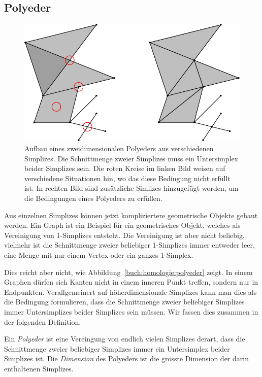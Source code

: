 \subsection{Polyeder}
\begin{figure}
\centering
\includegraphics{chapters/95-homologie/images/polyeder.pdf}
\caption{Aufbau eines zweidimensionalen Polyeders aus
verschiedenen Simplizes.
Die Schnittmenge zweier Simplizes muss ein Untersimplex beider Simplizes
sein.
Die roten Kreise im linken Bild weisen auf verschiedene Situationen
hin, wo das diese Bedingung nicht erfüllt ist.
In rechten Bild sind zusätzliche Simlizes hinzugefügt worden, um
die Bedingungen eines Polyeders zu erfüllen.
\label{buch:homologie:figure:polyeder}}
\end{figure}
Aus einzelnen Simplizes können jetzt kompliziertere geometrische
Objekte gebaut werden.
Ein Graph ist ein Beispiel für ein geometrisches Objekt, welches
als Vereinigung von 1-Simplizes entsteht.
Die Vereinigung ist aber nicht beliebig, vielmehr ist die Schnittmenge
zweier beliebiger 1-Simplizes immer entweder leer, eine Menge 
mit nur einem Vertex oder ein ganzes 1-Simplex.

Dies reicht aber nicht, wie Abbildung~\ref{buch:homologie:polyeder}
zeigt.
In einem Graphen dürfen sich Kanten nicht in einem inneren Punkt treffen,
sondern nur in Endpunkten.
Verallgemeinert auf höherdimensionale Simplizes kann man dies als die
Bedingung formulieren, dass die Schnittmenge zweier beliebiger
Simplizes immer Untersimplizes beider Simplizes sein müssen.
Wir fassen dies zusammen in der folgenden Definition.

\begin{definition}
%
%
%
Ein {\em Polyeder} ist eine Vereingung von endlich vielen Simplizes derart,
dass die Schnittmenge zweier beliebiger Simplizes immer ein Untersimplex
beider Simplizes ist.
Die {\em Dimension} des Polyeders ist die grösste Dimension der darin
enthaltenen Simplizes.
\end{definition}

